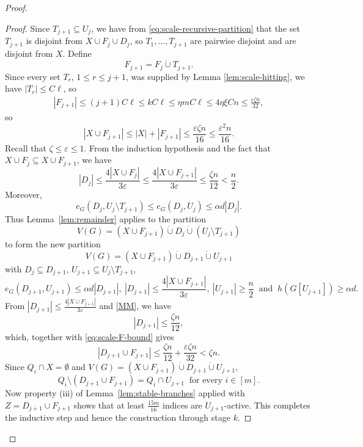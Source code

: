\documentclass[10pt,a4paper]{amsart}
\newcommand{\eps}{\varepsilon}
\begin{document}
\begin{proof}
\begin{proof}
Since $T_{j+1}\subseteq U_j$, we have from 
\eqref{eq:scale-recursive-partition} that  the set
$T_{j+1}$ is disjoint from $X\cup F_j\cup D_j$, so 
$T_1,\ldots,T_{j+1}$ are pairwise disjoint and are disjoint from
$X$. Define
\[
 F_{j+1}=F_j\mathbin{\dot\cup}T_{j+1}.
\]
Since every set $T_r$, $1\le r\le j+1$, was supplied by Lemma \ref{lem:scale-hitting}, we have $|T_r|\le C\ell$,
so
\begin{equation}\label{eq:scale-F-bound}
 \begin{aligned}
 |F_{j+1}|
 \le (j+1)C\ell
 \le kC\ell
 \le\eta mC\ell
 \le4\eta\xi Cn
 \le\frac{\eps\zeta n}{32},
 \end{aligned}
\end{equation}
so
\begin{equation}\label{MM}
 |X\cup F_{j+1}|\le |X|+|F_{j+1}|
 \le\frac{\eps\zeta n}{16}
 \le\frac{\eps^2n}{16}.
\end{equation}
Recall that $\zeta\le\eps\le1$. From the induction hypothesis and the fact that 
$X\cup F_j\subseteq X\cup F_{j+1}$, we have
\[
 |D_j|
 \le\frac{4|X\cup F_j|}{3\eps}
 \le\frac{4|X\cup F_{j+1}|}{3\eps}
 \le\frac{\zeta n}{12}<\frac{n}{2}.
\]
Moreover,
\[
 e_G(D_j,U_j\setminus T_{j+1})
 \le e_G(D_j,U_j)
 \le\alpha d|D_j|.
\]
Thus Lemma~\ref{lem:remainder} applies to the partition
\[
 V(G)=(X\cup F_{j+1})\mathbin{\dot\cup}D_j
       \mathbin{\dot\cup}(U_j\setminus T_{j+1})
\]
to form the new partition 
\[
 V(G)=(X\cup F_{j+1})\mathbin{\dot\cup}D_{j+1}
       \mathbin{\dot\cup}U_{j+1}
\]
with 
$ D_j\subseteq D_{j+1}$,  
$U_{j+1}\subseteq U_j\setminus T_{j+1}$,
\[
 e_G(D_{j+1},U_{j+1})\le\alpha d|D_{j+1}|,
 \ 
 |D_{j+1}|\le\frac{4|X\cup F_{j+1}|}{3\eps},
\  
 |U_{j+1}|\ge\frac{n}{2}
 \  \text{ and }\ 
 h(G[U_{j+1}])\ge\alpha d.
\]
From $|D_{j+1}|\le\frac{4|X\cup F_{j+1}|}{3\eps}$ and \eqref{MM}, we have 
\[
 |D_{j+1}|\le\frac{\zeta n}{12},
\]
which, together with
\eqref{eq:scale-F-bound} gives
 \[
 |D_{j+1}\cup F_{j+1}|
 \le\frac{\zeta n}{12}+\frac{\eps\zeta n}{32}
 <\zeta n.
\]
Since $Q_i\cap X=\emptyset$ and $V(G)=(X\cup F_{j+1})\mathbin{\dot\cup}D_{j+1}
       \mathbin{\dot\cup}U_{j+1}$,
\[
 Q_i\setminus(D_{j+1}\cup F_{j+1})=Q_i\cap U_{j+1}
\ \text{ for every }i\in[m].
\]
Now property (iii) of Lemma~\ref{lem:stable-branches} applied
with $Z=D_{j+1}\cup F_{j+1}$ shows that at least
$\frac{15m}{16}$ indices are $U_{j+1}$-active. This completes the
inductive step and hence the construction through stage $k$.
\end{proof} 


\end{proof}
\end{document}

